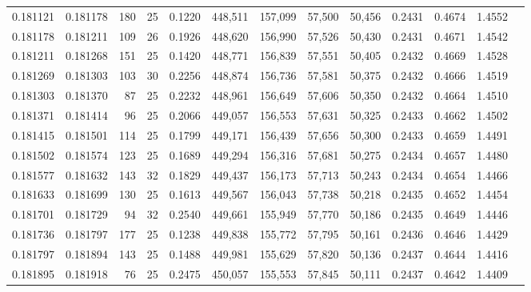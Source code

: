 \begin{tabular}{rrrrrrrrrrrrr}
0.181121 & 0.181178 & 180 &  25 &                                     0.1220 & 448,511 & 157,099 &  57,500 &  50,456 & 0.2431 & 0.4674 & 1.4552 \\
0.181178 & 0.181211 & 109 &  26 &                                     0.1926 & 448,620 & 156,990 &  57,526 &  50,430 & 0.2431 & 0.4671 & 1.4542 \\
0.181211 & 0.181268 & 151 &  25 &                                     0.1420 & 448,771 & 156,839 &  57,551 &  50,405 & 0.2432 & 0.4669 & 1.4528 \\
0.181269 & 0.181303 & 103 &  30 &                                     0.2256 & 448,874 & 156,736 &  57,581 &  50,375 & 0.2432 & 0.4666 & 1.4519 \\
0.181303 & 0.181370 &  87 &  25 &                                     0.2232 & 448,961 & 156,649 &  57,606 &  50,350 & 0.2432 & 0.4664 & 1.4510 \\
0.181371 & 0.181414 &  96 &  25 &                                     0.2066 & 449,057 & 156,553 &  57,631 &  50,325 & 0.2433 & 0.4662 & 1.4502 \\
0.181415 & 0.181501 & 114 &  25 &                                     0.1799 & 449,171 & 156,439 &  57,656 &  50,300 & 0.2433 & 0.4659 & 1.4491 \\
0.181502 & 0.181574 & 123 &  25 &                                     0.1689 & 449,294 & 156,316 &  57,681 &  50,275 & 0.2434 & 0.4657 & 1.4480 \\
0.181577 & 0.181632 & 143 &  32 &                                     0.1829 & 449,437 & 156,173 &  57,713 &  50,243 & 0.2434 & 0.4654 & 1.4466 \\
0.181633 & 0.181699 & 130 &  25 &                                     0.1613 & 449,567 & 156,043 &  57,738 &  50,218 & 0.2435 & 0.4652 & 1.4454 \\
0.181701 & 0.181729 &  94 &  32 &                                     0.2540 & 449,661 & 155,949 &  57,770 &  50,186 & 0.2435 & 0.4649 & 1.4446 \\
0.181736 & 0.181797 & 177 &  25 &                                     0.1238 & 449,838 & 155,772 &  57,795 &  50,161 & 0.2436 & 0.4646 & 1.4429 \\
0.181797 & 0.181894 & 143 &  25 &                                     0.1488 & 449,981 & 155,629 &  57,820 &  50,136 & 0.2437 & 0.4644 & 1.4416 \\
0.181895 & 0.181918 &  76 &  25 &                                     0.2475 & 450,057 & 155,553 &  57,845 &  50,111 & 0.2437 & 0.4642 & 1.4409 \\

\end{tabular}
